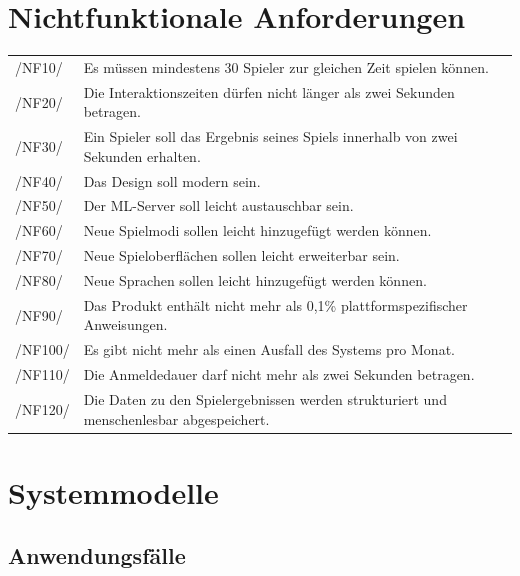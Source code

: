 \documentclass[a4paper]{scrreprt}
\begin{document}
    \chapter{Nichtfunktionale Anforderungen}

    \begin{tabular}{ l l}
        /NF10/ & Es müssen mindestens 30 \Gls{Spieler} zur gleichen Zeit spielen können.\\
        /NF20/ & Die Interaktionszeiten dürfen nicht länger als zwei Sekunden betragen. \\
        /NF30/ & Ein \Gls{Spieler} soll das Ergebnis seines Spiels innerhalb von zwei Sekunden erhalten. \\
        /NF40/ & Das Design soll modern sein. \\
        /NF50/ & Der \Gls{ML-Server} soll leicht austauschbar sein. \\
        /NF60/ & Neue Spielmodi sollen leicht hinzugefügt werden können. \\
        /NF70/ & Neue Spieloberflächen sollen leicht erweiterbar sein. \\
        /NF80/ & Neue Sprachen sollen leicht hinzugefügt werden können. \\
        /NF90/ & Das Produkt enthält nicht mehr als 0,1\% plattformspezifischer Anweisungen. \\
        /NF100/ & Es gibt nicht mehr als einen Ausfall des Systems pro Monat. \\ %
        /NF110/ & Die Anmeldedauer darf nicht mehr als zwei Sekunden betragen. \\
        /NF120/ & Die Daten zu den Spielergebnissen werden strukturiert und menschenlesbar abgespeichert.\footnotemark\\
    \end{tabular}

    \chapter{Systemmodelle}
    \section{Anwendungsfälle}
\end{document}
